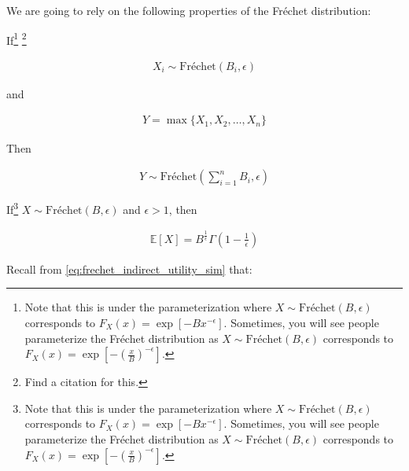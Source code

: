 \documentclass[10pt]{article}
\begin{document}
We are going to rely on the following properties of 
the Fréchet distribution:

\begin{notes}
    \label{notes:frechet_max_stability}
    If\footnote{
        Note that this is under the parameterization where 
        $X \sim \text{Fréchet}(B, \epsilon)$ corresponds to $F_X(x)=\exp \left[-B x^{-\epsilon}\right]$.
        Sometimes, you will see people parameterize the Fréchet distribution
        as $X \sim \text{Fréchet}(B, \epsilon)$ corresponds to $F_X(x)=\exp \left[-\left(\frac{x}{B}\right)^{-\epsilon}\right]$.
    } \footnote{\color{red} Find a citation for this.} 

    \begin{align}
        X_i \sim \text{Fréchet}(B_i, \epsilon)
    \end{align}

    and 

    \begin{align}
        Y = \max\{X_1, X_2, \ldots, X_n\}
    \end{align}

    Then 

    \begin{align}
        Y \sim \text{Fréchet}\left(\sum_{i=1}^n B_i, \epsilon\right)
    \end{align}

\end{notes}

\begin{notes}
    \label{notes:frechet_expected_value}
    If\footnote{
        Note that this is under the parameterization where 
        $X \sim \text{Fréchet}(B, \epsilon)$ corresponds to $F_X(x)=\exp \left[-B x^{-\epsilon}\right]$.
        Sometimes, you will see people parameterize the Fréchet distribution
        as $X \sim \text{Fréchet}(B, \epsilon)$ corresponds to $F_X(x)=\exp \left[-\left(\frac{x}{B}\right)^{-\epsilon}\right]$.
    } 
    $X \sim \text{Fréchet}(B, \epsilon)$ and 
    $\epsilon > 1$, then

    \begin{align}
        \mathbb{E}[X] = B^{\frac{1}{\epsilon}} \Gamma\left(1-\frac{1}{\epsilon}\right)
    \end{align}

    
\end{notes}

Recall from \eqref{eq:frechet_indirect_utility_sim} that:
\end{document}

